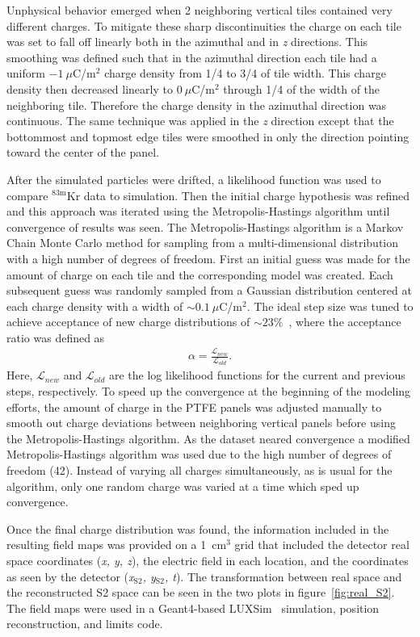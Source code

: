 \documentclass[11pt,a4paper]{article}
\newcommand{\isot}[2]{$^{\textrm{#2}}$#1 }
\newcommand{\krm}{\isot{Kr}{83m}}
\newcommand{\subStwo}{$_{\textrm{S2}}$}
\begin{document}
Unphysical behavior emerged when 2 neighboring vertical tiles contained very different charges. To mitigate these sharp discontinuities the charge on each tile was set to fall off linearly both in the azimuthal and in \textit{z} directions. This smoothing was defined such that in the azimuthal direction each tile had a uniform $-1~\mu$C/m$^2$ charge density from 1/4 to 3/4 of tile width. This charge density then decreased linearly to $0~\mu$C/m$^2$ through 1/4 of the width of the neighboring tile. Therefore the charge density in the azimuthal direction was continuous. The same technique was applied in the \textit{z} direction except that the bottommost and topmost edge tiles were smoothed in only the direction pointing toward the center of the panel.

After the simulated particles were drifted, a likelihood function was used to compare \krm data to simulation. Then the initial charge hypothesis was refined and this approach was iterated using the Metropolis-Hastings algorithm until convergence of results was seen. The Metropolis-Hastings algorithm is a Markov Chain Monte Carlo method for sampling from a multi-dimensional distribution with a high number of degrees of freedom. First an initial guess was made for the amount of charge on each tile and the corresponding model was created. Each subsequent guess was randomly sampled from a Gaussian distribution centered at each charge density with a width of $\sim0.1~\mu$C/m$^2$. The ideal step size was tuned to achieve acceptance of new charge distributions of $\sim23\%$~\cite{chib1995understanding}, where the acceptance ratio was defined as
\begin{eqnarray}
\alpha=\frac{\mathcal{L}_{new}}{\mathcal{L}_{old}}.
\end{eqnarray}
Here, $\mathcal{L}_{new}$ and $\mathcal{L}_{old}$ are the log likelihood functions for the current and previous steps, respectively. To speed up the convergence at the beginning of the modeling efforts, the amount of charge in the PTFE panels was adjusted manually to smooth out charge deviations between neighboring vertical panels before using the Metropolis-Hastings algorithm. As the dataset neared convergence a modified Metropolis-Hastings algorithm was used due to the high number of degrees of freedom (42). Instead of varying all charges simultaneously, as is usual for the algorithm, only one random charge was varied at a time which sped up convergence.

Once the final charge distribution was found, the information included in the resulting field maps was provided on a 1~cm$^3$ grid that included the detector real space coordinates (\textit{x, y, z}), the electric field in each location, and the coordinates as seen by the detector (\textit{x\subStwo, y\subStwo, t}). The transformation between real space and the reconstructed S2 space can be seen in the two plots in figure~\ref{fig:real_S2}. The field maps were used in a Geant4-based LUXSim~\cite{Akerib201263} simulation, position reconstruction, and limits code.
\end{document}
